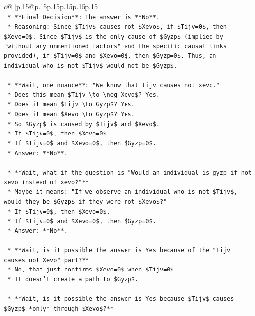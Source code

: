 \documentclass{article}
\begin{document}
{\begin{supertabular}{c@{$\;$}|p{.15\linewidth}@{}p{.15\linewidth}p{.15\linewidth}p{.15\linewidth}p{.15\linewidth}p{.15\linewidth}}
{{{\\ 
\texttt{    *   **Final Decision**: The answer is **No**.} \\
\texttt{        *   Reasoning: Since \$Tijv\$ causes not \$Xevo\$, if \$Tijv=0\$, then \$Xevo=0\$. Since \$Tijv\$ is the only cause of \$Gyzp\$ (implied by "without any unmentioned factors" and the specific causal links provided), if \$Tijv=0\$ and \$Xevo=0\$, then \$Gyzp=0\$. Thus, an individual who is not \$Tijv\$ would not be \$Gyzp\$.} \\
\\ 
\texttt{    *   **Wait, one nuance**: "We know that tijv causes not xevo."} \\
\texttt{        *   Does this mean \$Tijv \textbackslash{}to \textbackslash{}neg Xevo\$? Yes.} \\
\texttt{        *   Does it mean \$Tijv \textbackslash{}to Gyzp\$? Yes.} \\
\texttt{        *   Does it mean \$Xevo \textbackslash{}to Gyzp\$? Yes.} \\
\texttt{        *   So \$Gyzp\$ is caused by \$Tijv\$ and \$Xevo\$.} \\
\texttt{        *   If \$Tijv=0\$, then \$Xevo=0\$.} \\
\texttt{        *   If \$Tijv=0\$ and \$Xevo=0\$, then \$Gyzp=0\$.} \\
\texttt{        *   Answer: **No**.} \\
\\ 
\texttt{    *   **Wait, what if the question is "Would an individual is gyzp if not xevo instead of xevo?"**} \\
\texttt{        *   Maybe it means: "If we observe an individual who is not \$Tijv\$, would they be \$Gyzp\$ if they were not \$Xevo\$?"} \\
\texttt{        *   If \$Tijv=0\$, then \$Xevo=0\$.} \\
\texttt{        *   If \$Tijv=0\$ and \$Xevo=0\$, then \$Gyzp=0\$.} \\
\texttt{        *   Answer: **No**.} \\
\\ 
\texttt{    *   **Wait, is it possible the answer is Yes because of the "Tijv causes not Xevo" part?**} \\
\texttt{        *   No, that just confirms \$Xevo=0\$ when \$Tijv=0\$.} \\
\texttt{        *   It doesn't create a path to \$Gyzp\$.} \\
\\ 
\texttt{    *   **Wait, is it possible the answer is Yes because \$Tijv\$ causes \$Gyzp\$ *only* through \$Xevo\$?**} \\
}}}
\end{supertabular}}
\end{document}
